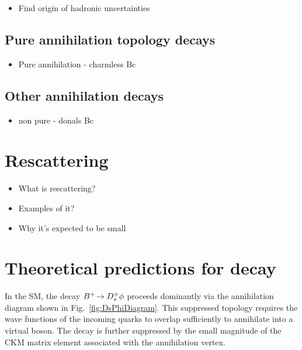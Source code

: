 {\color{Red}
\begin{itemize}
\item Find origin of hadronic uncertainties 
\end{itemize}}


\subsection{Pure annihilation topology decays}
{\color{Red}
\begin{itemize}
\item Pure annihilation - charmless Bc
\end{itemize}}
\subsection{Other annihilation decays}

{\color{Red}
\begin{itemize}
\item non pure - donals Bc 
\end{itemize}}

\section{Rescattering}

{\color{Red}
\begin{itemize}
\item What is rescattering?
\item Examples of it?
\item Why it's expected to be small
\end{itemize}}

\section{Theoretical predictions for \decay{\Bp}{\Dsp\phiz} decay}
{\color{Blue}
In the SM, the decay ${{{B}^+}}\!\rightarrow {\ensuremath{{D}^+_{s}}}\phi$ proceeds dominantly via the annihilation diagram shown in Fig.~\ref{fig:DsPhiDiagram}. 
This suppressed topology requires the wave functions of the incoming quarks to overlap sufficiently to annihilate into a virtual \Wp boson. 
The decay is further suppressed by the small magnitude of the CKM matrix element \Vub associated with the annihilation vertex. 


}


